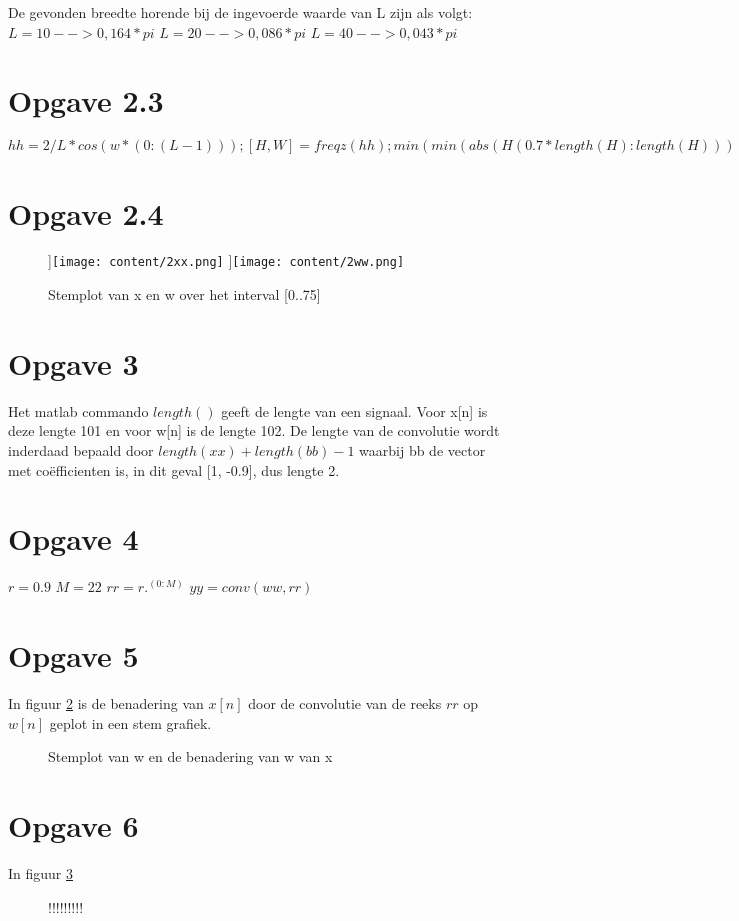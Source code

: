 \documentclass{article}
\begin{document}
De gevonden breedte horende bij de ingevoerde waarde van L zijn als volgt:
$L=10 --> 0,164*pi$
$L=20 --> 0,086*pi$
$L=40 --> 0,043*pi $


\section{Opgave 2.3}
$hh = 2/L*cos(w*(0:(L-1))); 
[H,W] = freqz(hh); 
min(min(abs(H(0.7*length(H): length(H))) <= 0.1), (min(abs(H(1:0.3*length(H))) <= 0.1) == 1))$

\section{Opgave 2.4}
\begin{figure}[h]
  \centering
 	\subfloat[][x[n]]{\texttt{[image: content/2xx.png]}}
	\subfloat[][w[n]]{\texttt{[image: content/2ww.png]}}
  \caption{Stemplot van x en w over het interval [0..75]}
  \label{fig:opgave2}
\end{figure}

\section{Opgave 3}
Het matlab commando $length()$ geeft de lengte van een signaal. Voor x[n] is deze lengte 101 en voor w[n] is de lengte 102. De lengte van de convolutie wordt inderdaad bepaald door $length(xx)+length(bb)-1$ waarbij bb de vector met co\"efficienten is, in dit geval [1, -0.9], dus lengte 2.

\section{Opgave 4}
$r = 0.9$
$M = 22$
$rr = r .^ (0:M)$
$yy = conv(ww, rr)$

\section{Opgave 5}
In figuur \ref{fig:opgave5} is de benadering van $x[n]$ door de convolutie van de reeks $rr$ op $w[n]$ geplot in een stem grafiek.
\begin{figure}[h]
  \centering
  \caption{Stemplot van w en de benadering van w van x}
  \label{fig:opgave5}
\end{figure}
\section{Opgave 6}
In figuur \ref{fig:opgave6}
\begin{figure}[h]
  \centering
  \caption{!!!!!!!!!}
  \label{fig:opgave6}
\end{figure}
\end{document}
